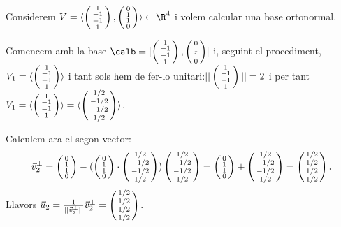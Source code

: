 \begin{exemple}\label{exemple:GramSchmidt}
Considerem $V=\langle \smat{1\\-1\\-1\\1}, \smat{0\\1\\1\\0}\rangle \subset \R^4$ i volem calcular una base ortonormal.

Comencem amb la base $\calb=[\smat{1\\-1\\-1\\1}, \smat{0\\1\\1\\0}]$ i, seguint el procediment, $V_1=\langle \smat{1\\-1\\-1\\1}\rangle$ i tant sols hem de fer-lo unitari:$||\smat{1\\-1\\-1\\1}||=2$ i per tant $V_1=\langle \smat{1\\-1\\-1\\1}\rangle=\langle \smat{1/2\\-1/2\\-1/2\\1/2}\rangle$.

Calculem ara el segon vector:
\[
\vec v_2^\perp = \smat{0\\1\\1\\0} - (\smat{0\\1\\1\\0}\cdot\smat{1/2\\-1/2\\-1/2\\1/2})\smat{1/2\\-1/2\\-1/2\\1/2}= \smat{0\\1\\1\\0}+\smat{1/2\\-1/2\\-1/2\\1/2}=\smat{1/2\\1/2\\1/2\\1/2}.
\]
Llavors $\vec u_2=\frac{1}{||\vec v_2^\perp||} \vec v_2^\perp=\smat{1/2\\1/2\\1/2\\1/2}$.


\end{exemple}
